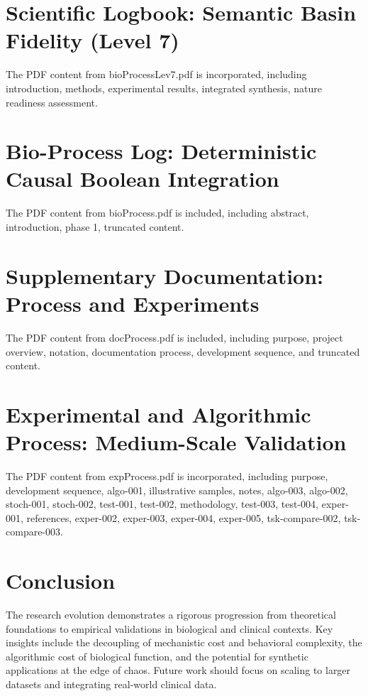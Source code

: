 \documentclass{article}
\begin{document}
\section{Scientific Logbook: Semantic Basin Fidelity (Level 7)}
The PDF content from bioProcessLev7.pdf is incorporated, including introduction, methods, experimental results, integrated synthesis, nature readiness assessment.

\section{Bio-Process Log: Deterministic Causal Boolean Integration}
The PDF content from bioProcess.pdf is included, including abstract, introduction, phase 1, truncated content.

\section{Supplementary Documentation: Process and Experiments}
The PDF content from docProcess.pdf is included, including purpose, project overview, notation, documentation process, development sequence, and truncated content.

\section{Experimental and Algorithmic Process: Medium-Scale Validation}
The PDF content from expProcess.pdf is incorporated, including purpose, development sequence, algo-001, illustrative samples, notes, algo-003, algo-002, stoch-001, stoch-002, test-001, test-002, methodology, test-003, test-004, exper-001, references, exper-002, exper-003, exper-004, exper-005, tsk-compare-002, tsk-compare-003.

\section{Conclusion}
The research evolution demonstrates a rigorous progression from theoretical foundations to empirical validations in biological and clinical contexts. Key insights include the decoupling of mechanistic cost and behavioral complexity, the algorithmic cost of biological function, and the potential for synthetic applications at the edge of chaos. Future work should focus on scaling to larger datasets and integrating real-world clinical data.




\makeatletter
{}
\makeatother
\end{document}
